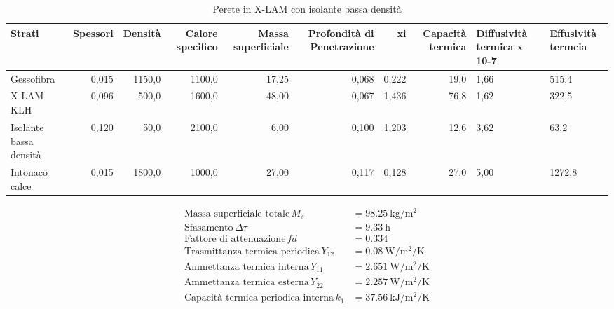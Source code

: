 \begin{table}
\centering
\caption{Perete in X-LAM con isolante bassa densità}
\begin{tabular}{lrrrrrrr}
\toprule
                 Strati & Spessori & Densità & Calore specifico & Massa superficiale & Profondità di Penetrazione &     xi & Capacità termica & Diffusività termica x 10-7 & Effusività termcia \\
\midrule
             Gessofibra &    0,015 &  1150,0 &           1100,0 &              17,25 &                      0,068 &  0,222 &             19,0 &                       1,66 &              515,4 \\
              X-LAM KLH &    0,096 &   500,0 &           1600,0 &              48,00 &                      0,067 &  1,436 &             76,8 &                       1,62 &              322,5 \\
 Isolante bassa densità &    0,120 &    50,0 &           2100,0 &               6,00 &                      0,100 &  1,203 &             12,6 &                       3,62 &               63,2 \\
         Intonaco calce &    0,015 &  1800,0 &           1000,0 &              27,00 &                      0,117 &  0,128 &             27,0 &                       5,00 &             1272,8 \\
\bottomrule
\end{tabular}
\end{table}

\begin{flushleft}
\begin{align*}
\text{Massa superficiale totale} \, M_s &= \SI{98.25}{\kilo\gram\per\metre\squared}\\
\text{Sfasamento} \, \Delta\tau &= \SI{9.33}{\hour}\\
\text{Fattore di attenuazione} \, fd &= \SI{0.334}{}\\
\text{Trasmittanza termica periodica} \, Y_{12} &= \SI{0.08}{\watt\per\metre\squared\per\kelvin}\\
\text{Ammettanza termica interna} \, Y_{11} &= \SI{2.651}{\watt\per\metre\squared\per\kelvin}\\
\text{Ammettanza termica esterna} \, Y_{22} &= \SI{2.257}{\watt\per\metre\squared\per\kelvin}\\
\text{Capacità termica periodica interna} \, k_1 &= \SI{37.56}{\kilo\joule\per\metre\squared\per\kelvin}\\
\end{align*}
\end{flushleft}
